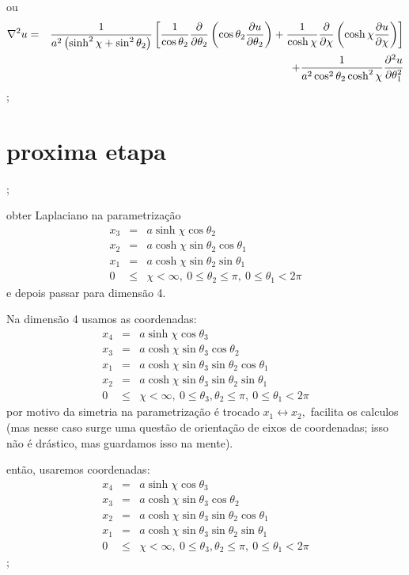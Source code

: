 \documentclass[a4paper,12pt]{article}
\begin{document}
ou 
\begin{eqnarray*}
\nabla ^{2}u &=&\frac{1}{a^{2}\left( \sinh ^{2}\chi +\sin ^{2}\theta
_{2}\right) }\left[ \frac{1}{\cos \theta _{2}}\frac{\partial }{\partial
\theta _{2}}\left( \cos \theta _{2}\frac{\partial u}{\partial \theta _{2}}%
\right) +\frac{1}{\cosh \chi }\frac{\partial }{\partial \chi }\left( \cosh
\chi \frac{\partial u}{\partial \chi }\right) \right]  \\
&&+\frac{1}{a^{2}\cos ^{2}\theta _{2}\cosh ^{2}\chi }\frac{\partial ^{2}u}{%
\partial \theta _{1}^{2}}
\end{eqnarray*}%
;

\section{proxima etapa}

;

obter Laplaciano na parametriza\c{c}\~{a}o%
\begin{eqnarray*}
x_{3} &=&a\sinh \chi \cos \theta _{2} \\
x_{2} &=&a\cosh \chi \sin \theta _{2}\cos \theta _{1} \\
x_{1} &=&a\cosh \chi \sin \theta _{2}\sin \theta _{1} \\
0 &\leq &\chi <\infty ,\ 0\leq \theta _{2}\leq \pi ,\ 0\leq \theta _{1}<2\pi 
\end{eqnarray*}%
e depois passar para dimens\~{a}o 4.

Na dimens\~{a}o 4 usamos as coordenadas:%
\begin{eqnarray*}
x_{4} &=&a\sinh \chi \cos \theta _{3} \\
x_{3} &=&a\cosh \chi \sin \theta _{3}\cos \theta _{2} \\
x_{1} &=&a\cosh \chi \sin \theta _{3}\sin \theta _{2}\cos \theta _{1} \\
x_{2} &=&a\cosh \chi \sin \theta _{3}\sin \theta _{2}\sin \theta _{1} \\
0 &\leq &\chi <\infty ,\ 0\leq \theta _{3},\theta _{2}\leq \pi ,\ 0\leq
\theta _{1}<2\pi 
\end{eqnarray*}%
por motivo da simetria na parametriza\c{c}\~{a}o \'{e} trocado $%
x_{1}\leftrightarrow x_{2},$ facilita os calculos (mas nesse caso surge uma
quest\~{a}o de orienta\c{c}\~{a}o de eixos de coordenadas; isso n\~{a}o \'{e}
dr\'{a}stico, mas guardamos isso na mente).

ent\~{a}o, usaremos coordenadas:%
\begin{eqnarray*}
x_{4} &=&a\sinh \chi \cos \theta _{3} \\
x_{3} &=&a\cosh \chi \sin \theta _{3}\cos \theta _{2} \\
x_{2} &=&a\cosh \chi \sin \theta _{3}\sin \theta _{2}\cos \theta _{1} \\
x_{1} &=&a\cosh \chi \sin \theta _{3}\sin \theta _{2}\sin \theta _{1} \\
0 &\leq &\chi <\infty ,\ 0\leq \theta _{3},\theta _{2}\leq \pi ,\ 0\leq
\theta _{1}<2\pi 
\end{eqnarray*}%
;
\end{document}
